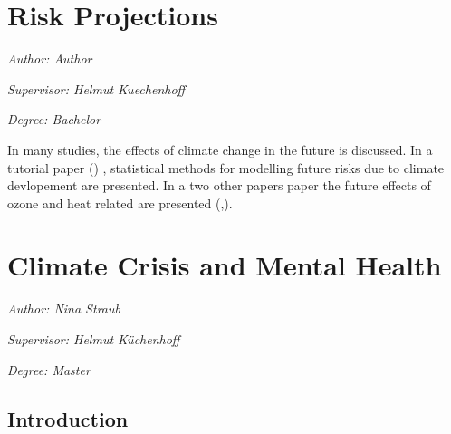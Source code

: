 \documentclass[
]{krantz}
\begin{document}
\chapter{Risk Projections}\label{he4}

\emph{Author: Author}

\emph{Supervisor: Helmut Kuechenhoff}

\emph{Degree: Bachelor}

In many studies, the effects of climate change in the future is discussed.
In a tutorial paper (\citet{vicedo}) , statistical methods for modelling future risks due to climate devlopement are presented. In a two other papers paper the future effects of ozone and heat related are presented (\citet{domingo},\citet{chen}).

\chapter{Climate Crisis and Mental Health}\label{menh3}

\emph{Author: Nina Straub}

\emph{Supervisor: Helmut Küchenhoff}

\emph{Degree: Master}

\section{Introduction}\label{introduction-9}
\end{document}
